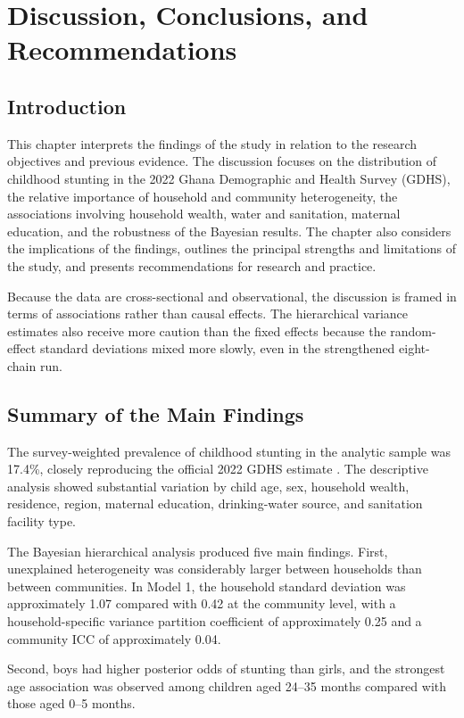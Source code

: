\chapter{Discussion, Conclusions, and Recommendations}
\label{chap:discussion}

\section{Introduction}

This chapter interprets the findings of the study in relation to the research objectives and previous evidence. The discussion focuses on the distribution of childhood stunting in the 2022 Ghana Demographic and Health Survey (GDHS), the relative importance of household and community heterogeneity, the associations involving household wealth, water and sanitation, maternal education, and the robustness of the Bayesian results. The chapter also considers the implications of the findings, outlines the principal strengths and limitations of the study, and presents recommendations for research and practice.

Because the data are cross-sectional and observational, the discussion is framed in terms of associations rather than causal effects. The hierarchical variance estimates also receive more caution than the fixed effects because the random-effect standard deviations mixed more slowly, even in the strengthened eight-chain run.

\section{Summary of the Main Findings}

The survey-weighted prevalence of childhood stunting in the analytic sample was 17.4\%, closely reproducing the official 2022 GDHS estimate \citep{GSSICF2024}. The descriptive analysis showed substantial variation by child age, sex, household wealth, residence, region, maternal education, drinking-water source, and sanitation facility type.

The Bayesian hierarchical analysis produced five main findings. First, unexplained heterogeneity was considerably larger between households than between communities. In Model 1, the household standard deviation was approximately 1.07 compared with 0.42 at the community level, with a household-specific variance partition coefficient of approximately 0.25 and a community ICC of approximately 0.04.

Second, boys had higher posterior odds of stunting than girls, and the strongest age association was observed among children aged 24--35 months compared with those aged 0--5 months.

